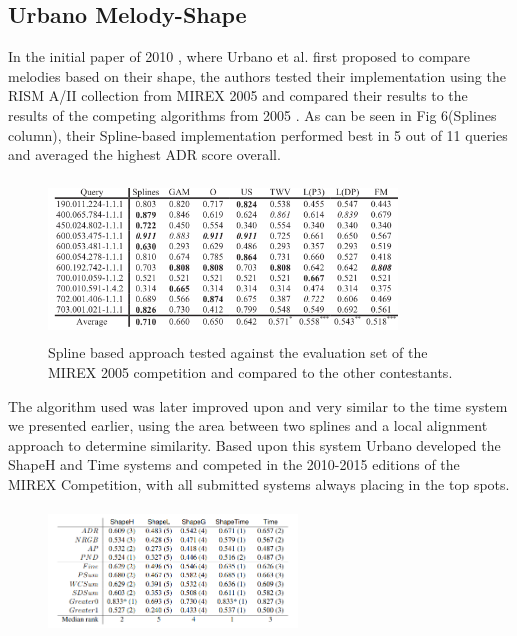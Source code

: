 \documentclass{llncs}
\begin{document}
\begin{itemize}
  \subsection{Urbano Melody-Shape}
            In the initial paper of 2010 \cite{five_point_five}, where Urbano et al. first proposed to compare melodies based on their shape, the authors tested their implementation using the RISM A/II collection from MIREX 2005 and compared their results to the results of the competing algorithms from 2005 . As can be seen in Fig 6(Splines column), their Spline-based implementation performed best in 5 out of 11 queries  and averaged the highest ADR score overall. 
        \begin{figure}[h!]
			\centering
            \includegraphics[width=350px,height=160px,keepaspectratio]{one_of_five_point_five}
			\caption{Spline based approach tested against the evaluation set of the MIREX 2005 competition and compared to the other contestants. \cite{five_point_five}}
        \end{figure}
            The algorithm used was later improved upon and very similar to the time system we presented earlier, using the area between two splines and a local alignment approach to determine similarity. Based upon this system Urbano developed the ShapeH and Time systems  and competed in the 2010-2015 editions of the MIREX Competition, with all submitted systems always placing in the top spots. \cite{five_point_six}\cite{five_point_seven}\cite{five_point_four}
            \cite{five_point_three}
            \cite{five_point_two}
            \cite{five_point_eight}
        \begin{figure}[h!]
			\centering
            \includegraphics[width=250px,height=125px,keepaspectratio]{urbano_mirex_2012_results}

\end{figure}
\end{itemize}
\end{document}
